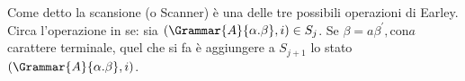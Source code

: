 \documentclass{subfiles}
\begin{document}
Come detto la scansione (o Scanner) è una delle tre possibili operazioni di Earley.
Circa l'operazione in se: sia \((\Grammar{A}{\alpha . \beta} , i) \in S_{j}\). Se \(\beta = a\beta^{'}, \text{con} a\) carattere terminale,
quel che si fa è aggiungere a \(S_{j + 1}\) lo stato \((\Grammar{A}{\alpha . \beta} , i)\).
\end{document}
